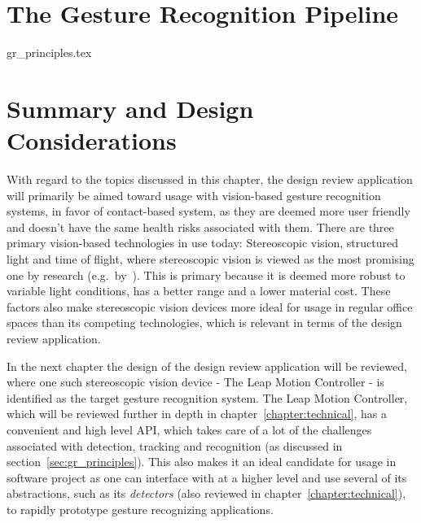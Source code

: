 \section{The Gesture Recognition Pipeline}
\label{sec:gr_principles}
{gr_principles.tex}


\section{Summary and Design Considerations}
\label{sec:gesture_design_considerations}
With regard to the topics discussed in this chapter, the design review application will primarily be aimed toward usage with vision-based gesture recognition
systems, in favor of contact-based system, as they are deemed more user friendly and doesn't have the same health risks associated with them.
There are three primary vision-based technologies in use today: Stereoscopic vision, structured light and time of flight, where stereoscopic vision is 
viewed as the most promising one by research (e.g.~by~\citet{Ko2012}). This is primary because it is deemed more robust to variable light conditions, has 
a better range and a lower material cost. These factors also make stereoscopic vision devices more ideal for usage in regular office spaces than its competing technologies, 
which is relevant in terms of the design review application. 

In the next chapter the design of the design review application will be reviewed, where one such stereoscopic vision device - The Leap Motion Controller - is identified as the target
gesture recognition system. The Leap Motion Controller, which will be reviewed further in depth in chapter~\ref{chapter:technical}, has a convenient and high
level API, which takes care of a lot of the challenges associated with detection, tracking and recognition (as discussed in section~\vref{sec:gr_principles}). 
This also makes it an ideal candidate for usage in software project as one can interface with at a higher level and use several of its abstractions, 
such as its \textit{detectors} (also reviewed in chapter~\ref{chapter:technical}), to rapidly prototype gesture recognizing applications. 



